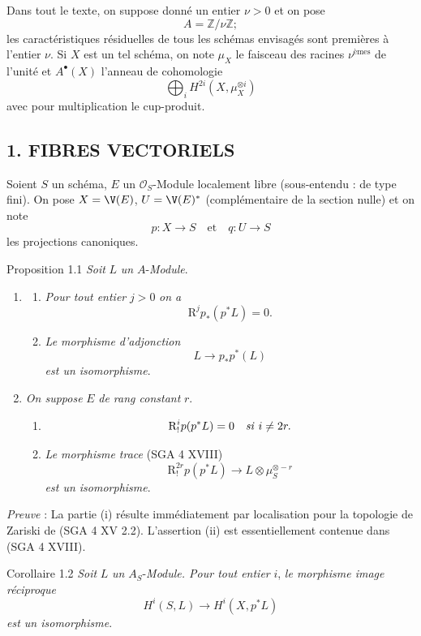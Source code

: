 Dans tout le texte, on suppose donné un entier $\nu>0$ et on pose
\[
A=\mathbb{Z}/\nu\mathbb{Z};
\]
les caractéristiques résiduelles de tous les schémas envisagés sont premières à l'entier $\nu$. Si $X$ est un tel schéma, on note $\mu_X$ le faisceau des racines $\nu^{\text{èmes}}$ de l'unité et $A^{\bullet}(X)$ l'anneau de cohomologie
\[
\bigoplus_i H^{2i}(X,\mu_X^{\otimes i})
\]
avec pour multiplication le cup-produit.

\subsection*{1. FIBRES VECTORIELS}

Soient $S$ un schéma, $E$ un $\mathcal{O}_S$-Module localement libre (sous-entendu : de type fini). On pose $X=\V(E)$, $U=\V(E)^*$ (complémentaire de la section nulle) et on
note
\[
p:X\to S
\quad\text{et}\quad
q:U\to S
\]
les projections canoniques.

\begin{statement}{Proposition 1.1}
\emph{Soit} $L$ \emph{un} $A$-\emph{Module}.
\begin{enumerate}[label=(\roman*)]
\item
\begin{enumerate}[label=\alph*)]
\item \emph{Pour tout entier} $j>0$ \emph{on a}
\[
\mathrm{R}^j p_*(p^*L)=0.
\]
\item \emph{Le morphisme d'adjonction}
\[
L\longrightarrow p_*p^*(L)
\]
\emph{est un isomorphisme}.
\end{enumerate}
\item \emph{On suppose} $E$ \emph{de rang constant} $r$.
\begin{enumerate}[label=\alph*)]
\item
\[
\mathrm{R}_!^i p(p^*L)=0\quad\text{\emph{si} }i\ne 2r.
\]
\item \emph{Le morphisme trace} (SGA 4 XVIII)
\[
\mathrm{R}_!^{2r}p(p^*L)\longrightarrow L\otimes\mu_S^{\otimes -r}
\]
\emph{est un isomorphisme}.
\end{enumerate}
\end{enumerate}
\end{statement}

\emph{Preuve} : La partie (i) résulte immédiatement par localisation pour la topologie de Zariski de (SGA 4 XV 2.2). L'assertion (ii) est essentiellement contenue dans (SGA 4 XVIII).

\begin{statement}{Corollaire 1.2}
\emph{Soit} $L$ \emph{un} $A_S$-\emph{Module. Pour tout entier} $i$, \emph{le morphisme image réciproque}
\[
H^i(S,L)\longrightarrow H^i(X,p^*L)
\]
\emph{est un isomorphisme}.
\end{statement}

